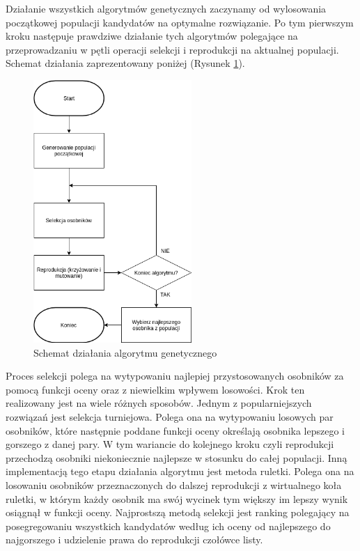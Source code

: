 \documentclass[12pt, oneside, a4paper]{report}
\begin{document}
Działanie wszystkich algorytmów genetycznych zaczynamy od wylosowania początkowej populacji kandydatów na optymalne rozwiązanie. Po tym pierwszym kroku następuje prawdziwe działanie tych algorytmów polegające na przeprowadzaniu w pętli operacji selekcji i reprodukcji na aktualnej populacji. Schemat działania zaprezentowany poniżej (Rysunek \ref{fig: 3.1}).

\begin{figure}[h]
	\centering
	\includegraphics[width=6cm]{fig31.png}
	\caption{Schemat działania algorytmu genetycznego}
	\label{fig: 3.1}
\end{figure}

Proces selekcji polega na wytypowaniu najlepiej przystosowanych osobników za pomocą funkcji oceny oraz z niewielkim wpływem losowości. Krok ten realizowany jest na wiele różnych sposobów. Jednym z popularniejszych rozwiązań jest selekcja turniejowa. Polega ona na wytypowaniu losowych par osobników, które następnie poddane funkcji oceny określają osobnika lepszego i gorszego z danej pary. W tym wariancie do kolejnego kroku czyli reprodukcji przechodzą osobniki niekoniecznie najlepsze w stosunku do całej populacji. Inną implementacją tego etapu działania algorytmu jest metoda ruletki. Polega ona na losowaniu osobników przeznaczonych do dalszej reprodukcji z wirtualnego koła ruletki, w którym każdy osobnik ma swój wycinek tym większy im lepszy wynik osiągnął w funkcji oceny. Najprostszą metodą selekcji jest ranking polegający na posegregowaniu wszystkich kandydatów według ich oceny od najlepszego do najgorszego i udzielenie prawa do reprodukcji czołówce listy.
\end{document}
